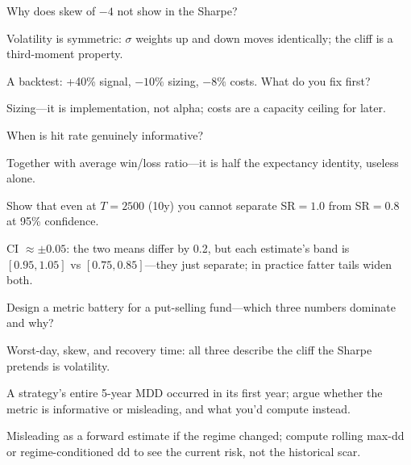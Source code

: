 \begin{exercise}
Why does skew of $-4$ not show in the Sharpe?
\end{exercise}
\begin{solution}
Volatility is symmetric: $\sigma$ weights up and down moves identically; the cliff is a
third-moment property.
\end{solution}

\begin{exercise}
A backtest: +40\% signal, $-10\%$ sizing, $-8\%$ costs. What do you fix first?
\end{exercise}
\begin{solution}
Sizing---it is implementation, not alpha; costs are a capacity ceiling for later.
\end{solution}

\begin{exercise}
When is hit rate genuinely informative?
\end{exercise}
\begin{solution}
Together with average win/loss ratio---it is half the expectancy identity, useless alone.
\end{solution}

\begin{exercise}[hard]
Show that even at $T{=}2500$ (10y) you cannot separate SR${=}1.0$ from SR${=}0.8$ at
95\% confidence.
\end{exercise}
\begin{solution}
CI $\approx\pm0.05$: the two means differ by 0.2, but each estimate's band is
$[0.95,1.05]$ vs $[0.75,0.85]$---they just separate; in practice fatter tails widen both.
\end{solution}

\begin{exercise}[hard]
Design a metric battery for a put-selling fund---which three numbers dominate and why?
\end{exercise}
\begin{solution}
Worst-day, skew, and recovery time: all three describe the cliff the Sharpe pretends is
volatility.
\end{solution}

\begin{exercise}[hard]
A strategy's entire 5-year MDD occurred in its first year; argue whether the metric is
informative or misleading, and what you'd compute instead.
\end{exercise}
\begin{solution}
Misleading as a forward estimate if the regime changed; compute rolling max-dd or
regime-conditioned dd to see the current risk, not the historical scar.
\end{solution}

